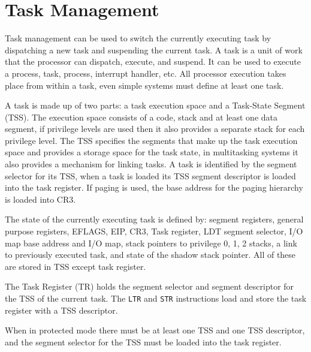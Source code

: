 \documentclass{article}
\newcommand{\layout}[1]{\parbox{\linewidth}{#1}}
\begin{document}
\layout{
  \section{Task Management}

  Task management can be used to switch the currently executing task by dispatching a new task and suspending the current task.
  A task is a unit of work that the processor can dispatch, execute, and suspend.
  It can be used to execute a process, task, process, interrupt handler, etc.
  All processor execution takes place from within a task, even simple systems must define at least one task.

  \bigskip \cite[Chapter~9.1]{sdm3}
} \bigskip

\layout{
  A task is made up of two parts: a task execution space and a Task-State Segment (TSS).
  The execution space consists of a code, stack and at least one data segment, if privilege levels are used then it also provides a separate stack for each privilege level.
  The TSS specifies the segments that make up the task execution space and provides a storage space for the task state, in multitasking systems it also provides a mechanism for linking tasks.
  A task is identified by the segment selector for its TSS, when a task is loaded its TSS segment descriptor is loaded into the task register.
  If paging is used, the base address for the paging hierarchy is loaded into CR3.

  \bigskip \cite[Chapter~9.1.1]{sdm3}
} \bigskip

\layout{
  The state of the currently executing task is defined by: segment registers, general purpose registers, EFLAGS, EIP, CR3, Task register, LDT segment selector, I/O map base address and I/O map, stack pointers to privilege 0, 1, 2 stacks, a link to previously executed task, and state of the shadow stack pointer.
  All of these are stored in TSS except task register.

  \bigskip \cite[Chapter~9.1.2]{sdm3}
} \bigskip

\layout{
  The Task Register (TR) holds the segment selector and segment descriptor for the TSS of the current task.
  The \texttt{LTR} and \texttt{STR} instructions load and store the task register with a TSS descriptor.
  \cite[Chapter~9.2.4]{sdm3}
} \bigskip

\layout{
  When in protected mode there must be at least one TSS and one TSS descriptor, and the segment selector for the TSS must be loaded into the task register.
  \cite[Chapter~9.2]{sdm3}
} \bigskip
\end{document}
